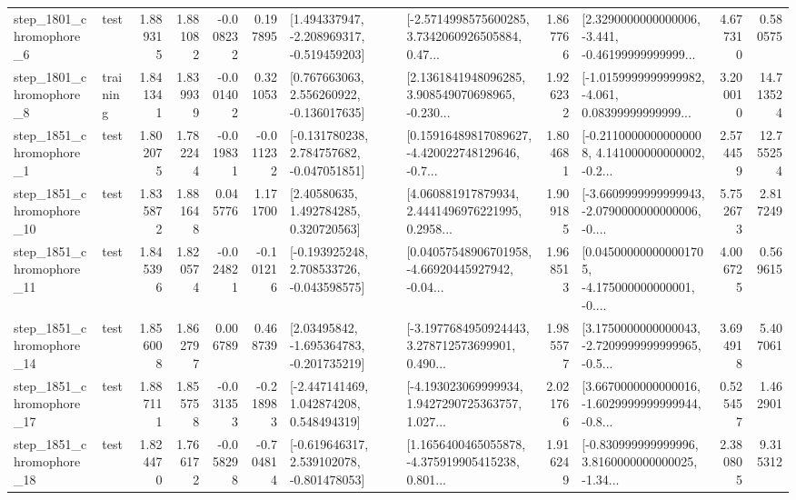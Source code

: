 \begin{tabular}{llrrrrllrlrr}
  step\_1801\_chromophore\_6 &      test &      1.889315 &    1.881082 &     -0.008232 &  0.197895 &   [1.494337947, -2.208969317, -0.519459203] &  [-2.5714998575600285, 3.7342060926505884, 0.47... &       1.867766 &  [2.3290000000000006, -3.441, -0.46199999999999... &            4.677310 &          0.580575 \\
  step\_1801\_chromophore\_8 &  training &      1.841341 &    1.839939 &     -0.001402 &  0.321053 &    [0.767663063, 2.556260922, -0.136017635] &  [2.1361841948096285, 3.908549070698965, -0.230... &       1.926232 &  [-1.0159999999999982, -4.061, 0.08399999999999... &            3.200010 &         14.713524 \\
  step\_1851\_chromophore\_1 &      test &      1.802075 &    1.782244 &     -0.019831 & -0.011232 &   [-0.131780238, 2.784757682, -0.047051851] &  [0.15916489817089627, -4.420022748129646, -0.7... &       1.804681 &  [-0.21100000000000008, 4.141000000000002, -0.2... &            2.574459 &         12.755254 \\
 step\_1851\_chromophore\_10 &      test &      1.835872 &    1.881648 &      0.045776 &  1.171700 &      [2.40580635, 1.492784285, 0.320720563] &  [4.060881917879934, 2.4441496976221995, 0.2958... &       1.909185 &  [-3.6609999999999943, -2.0790000000000006, -0.... &            5.752673 &          2.817249 \\
 step\_1851\_chromophore\_11 &      test &      1.845396 &    1.820574 &     -0.024821 & -0.101216 &   [-0.193925248, 2.708533726, -0.043598575] &  [0.04057548906701958, -4.66920445927942, -0.04... &       1.968513 &  [0.045000000000001705, -4.175000000000001, -0.... &            4.006725 &          0.569615 \\
 step\_1851\_chromophore\_14 &      test &      1.856008 &    1.862797 &      0.006789 &  0.468739 &    [2.03495842, -1.695364783, -0.201735219] &  [-3.1977684950924443, 3.278712573699901, 0.490... &       1.985577 &  [3.1750000000000043, -2.7209999999999965, -0.5... &            3.694918 &          5.407061 \\
 step\_1851\_chromophore\_17 &      test &      1.887111 &    1.855758 &     -0.031353 & -0.218983 &    [-2.447141469, 1.042874208, 0.548494319] &  [-4.193023069999934, 1.9427290725363757, 1.027... &       2.021766 &  [3.6670000000000016, -1.6029999999999944, -0.8... &            0.525457 &          1.462901 \\
 step\_1851\_chromophore\_18 &      test &      1.824470 &    1.766172 &     -0.058298 & -0.704814 &   [-0.619646317, 2.539102078, -0.801478053] &  [1.1656400465055878, -4.375919905415238, 0.801... &       1.916249 &  [-0.830999999999996, 3.8160000000000025, -1.34... &            2.380805 &          9.315312 \\

\end{tabular}
